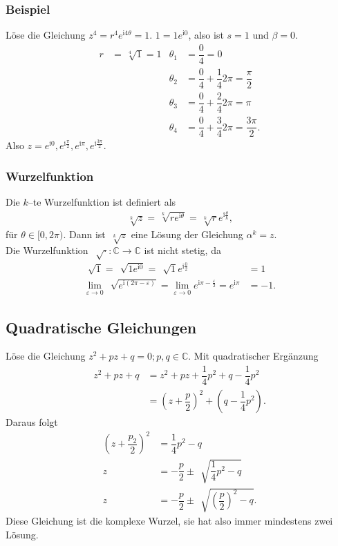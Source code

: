 \documentclass[a4paper,12pt]{article}
\numberwithin{equation}{section}
\begin{document}
\subsubsection{Beispiel}
Löse die Gleichung $z^4=r^4e^{\text{i}4\theta }=1$. $1=1e^{\text{i}0}$, also ist $s=1$ und $\beta =0$.
\begin{align} 
        r&=\,\sqrt[4]{1}=1&\theta _1&=\dfrac{0}{4}=0\nonumber \\
         &&\theta _2&=\dfrac{0}{4}+\dfrac{1}{4}2\pi =\dfrac{\pi }{2}\nonumber \\
         &&\theta _3&=\dfrac{0}{4}+\dfrac{2}{4}2\pi =\pi \nonumber \\
         &&\theta _4&=\dfrac{0}{4}+\dfrac{3}{4}2\pi =\dfrac{3\pi }{2}\nonumber 
.\end{align} 
Also $z=e^{\text{i}0},e^{\text{i}\tfrac{\pi }{2}},e^{\text{i}\pi },e^{\text{i}\tfrac{3\pi }{2}}$.

\subsubsection{Wurzelfunktion}
Die $k$--te Wurzelfunktion ist definiert als
\begin{align} 
        \,\sqrt[k]{z}=\,\sqrt[k]{re^{\text{i}\theta }}=\,\sqrt[k]{r}e^{\text{i}\tfrac{\theta }{k}}
,\end{align} 
für $\theta  \in [0,2\pi )$. Dann ist $\,\sqrt[k]{z}$ eine Lösung der Gleichung $\alpha ^k=z$.\\\indent
Die Wurzelfunktion $\,\sqrt[]{\cdot }:\mathbb{C}\rightarrow \mathbb{C}$ ist nicht stetig, da
\begin{align} 
        \,\sqrt[]{1}=\,\sqrt[]{1e^{\text{i}0}}=\,\sqrt[]{1}e^{\text{i}\tfrac{0}{2}}&=1\\
        \lim_{\varepsilon \rightarrow 0}\,\sqrt[]{e^{\text{i}\left(2\pi -\varepsilon \right)}}=\lim_{\varepsilon \rightarrow 0}e^{\text{i}\pi -\tfrac{\varepsilon }{2}}=e^{\text{i}\pi }&=-1
.\end{align} 

\subsection{Quadratische Gleichungen}
Löse die Gleichung $z^2+pz+q=0;p,q \in \mathbb{C}$. Mit quadratischer Ergänzung
\begin{align} 
        z^2+pz+q&=z^2+pz+\dfrac{1}{4}p^2+q-\dfrac{1}{4}p^2\\
                &=\left(z+\dfrac{p}{2}\right)^2+\left(q-\dfrac{1}{4}p^2\right)
.\end{align} 
Daraus folgt
\begin{align} 
        \left(z+\dfrac{p_2}{2}\right)^2&=\dfrac{1}{4}p^2-q\\
        z&=-\dfrac{p}{2}\pm \,\sqrt[]{\dfrac{1}{4}p^2-q}\\
        z&=-\dfrac{p}{2}\pm \,\sqrt[]{\left(\dfrac{p}{2}\right)^2-q}
.\end{align} 
Diese Gleichung ist die komplexe Wurzel, sie hat also immer mindestens zwei Lösung.
\end{document}

